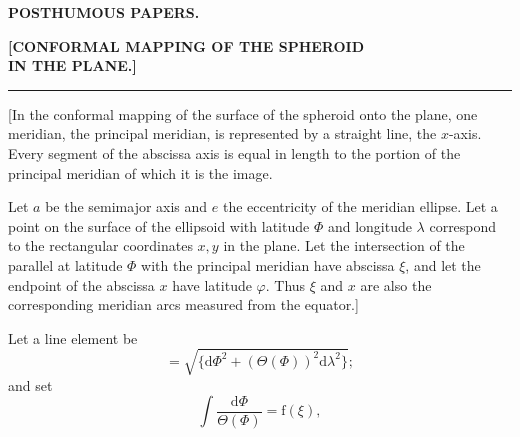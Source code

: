 \par\clearpage\null\thispagestyle{empty}\clearpage
\begin{center}
{\Large\textbf{POSTHUMOUS PAPERS.}}\par\medskip
{\large\textbf{[CONFORMAL MAPPING OF THE SPHEROID\\IN THE PLANE.]}}\par\smallskip
\rule{18mm}{.4pt}\par\medskip
[1.]\par{}
\end{center}
[In the conformal mapping of the surface of the spheroid onto the plane, one meridian, the principal meridian, is represented by a straight line, the \(x\)-axis. Every segment of the abscissa axis is equal in length to the portion of the principal meridian of which it is the image.

Let \(a\) be the semimajor axis and \(e\) the eccentricity of the meridian ellipse. Let a point on the surface of the ellipsoid with latitude \(\Phi\) and longitude \(\lambda\) correspond to the rectangular coordinates \(x,y\) in the plane. Let the intersection of the parallel at latitude \(\Phi\) with the principal meridian have abscissa \(\xi\), and let the endpoint of the abscissa \(x\) have latitude \(\varphi\). Thus \(\xi\) and \(x\) are also the corresponding meridian arcs measured from the equator.]

Let a line element be
\[=\sqrt{\{\mathrm d\Phi^2+(\Theta(\Phi))^2\mathrm d\lambda^2\}};\]
\noindent and set
\[\int\frac{\mathrm d\Phi}{\Theta(\Phi)}=\mathrm f(\xi),\]

